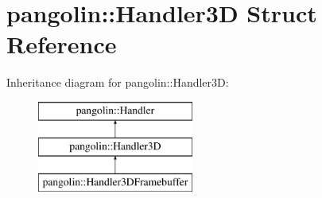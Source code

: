 \hypertarget{structpangolin_1_1_handler3_d}{}\section{pangolin\+:\+:Handler3D Struct Reference}
\label{structpangolin_1_1_handler3_d}
Inheritance diagram for pangolin\+:\+:Handler3D\+:\begin{figure}[H]
\begin{center}
\leavevmode
\includegraphics[height=3.000000cm]{structpangolin_1_1_handler3_d}
\end{center}
\end{figure}
